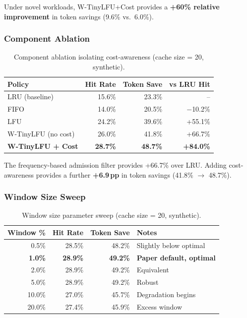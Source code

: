 \documentclass[11pt,a4paper]{article}
\begin{document}
Under novel workloads, W-TinyLFU+Cost provides a \textbf{+60\% relative improvement} in token savings (9.6\% vs.\ 6.0\%).

\subsubsection{Component Ablation}

\begin{table}[H]
\centering
\caption{Component ablation isolating cost-awareness (cache size = 20, synthetic).}
\label{tab:ablation_component}
\small
\begin{tabular}{@{} l rrr @{}}
\toprule
\textbf{Policy} & \textbf{Hit Rate} & \textbf{Token Save} & \textbf{vs LRU Hit} \\
\midrule
LRU (baseline)         & 15.6\% & 23.3\% & -- \\
FIFO                   & 14.0\% & 20.5\% & $-$10.2\% \\
LFU                    & 24.2\% & 39.6\% & +55.1\% \\
W-TinyLFU (no cost)    & 26.0\% & 41.8\% & +66.7\% \\
\rowcolor{maingreen!10}
\textbf{W-TinyLFU + Cost} & \textbf{28.7\%} & \textbf{48.7\%} & \textbf{+84.0\%} \\
\bottomrule
\end{tabular}
\end{table}

The frequency-based admission filter provides +66.7\% over LRU.
Adding cost-awareness provides a further \textbf{+6.9\,pp} in token savings (41.8\% $\to$ 48.7\%).

\subsubsection{Window Size Sweep}

\begin{table}[H]
\centering
\caption{Window size parameter sweep (cache size = 20, synthetic).}
\label{tab:window_sweep}
\small
\begin{tabular}{@{} r rr l @{}}
\toprule
\textbf{Window \%} & \textbf{Hit Rate} & \textbf{Token Save} & \textbf{Notes} \\
\midrule
0.5\%  & 28.5\% & 48.2\% & Slightly below optimal \\
\rowcolor{maingreen!10}
\textbf{1.0\%}  & \textbf{28.9\%} & \textbf{49.2\%} & \textbf{Paper default, optimal} \\
2.0\%  & 28.9\% & 49.2\% & Equivalent \\
5.0\%  & 28.9\% & 49.2\% & Robust \\
10.0\% & 27.0\% & 45.7\% & Degradation begins \\
20.0\% & 27.4\% & 45.9\% & Excess window \\
\bottomrule
\end{tabular}
\end{table}
\end{document}
